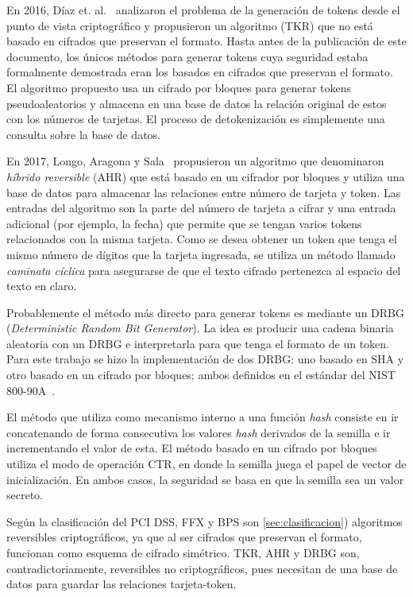 \documentclass[conference]{IEEEtran}
\begin{document}
  En 2016, Díaz et. al.~\cite{doc_sandra} analizaron el problema de la
  generación de tokens desde el punto de vista criptográfico y propusieron un
  algoritmo (TKR) que no está basado en cifrados que preservan el formato. Hasta
  antes de la publicación de este documento, los únicos métodos para generar
  tokens cuya seguridad estaba formalmente demostrada eran los basados en
  cifrados que preservan el formato.  El algoritmo propuesto usa un cifrado por
  bloques para generar tokens pseudoaleatorios y almacena en una base de datos
  la relación original de estos con los números de tarjetas. El proceso de
  detokenización es simplemente una consulta sobre la base de datos.

  En 2017, Longo, Aragona y Sala~\cite{aragona} propusieron un algoritmo que
  denominaron \textit{híbrido reversible} (AHR) que está basado en un cifrador
  por bloques y utiliza una base de datos para almacenar las relaciones entre
  número de tarjeta y token. Las entradas del algoritmo son la parte del número
  de tarjeta a cifrar y una entrada adicional (por ejemplo, la fecha) que
  permite que se tengan varios tokens relacionados con la misma tarjeta. Como se
  desea obtener un token que tenga el mismo número de dígitos que la tarjeta
  ingresada, se utiliza un método llamado \textit{caminata cíclica}
  \cite{blackrog} para asegurarse de que el texto cifrado pertenezca al espacio
  del texto en claro.

  Probablemente el método más directo para generar tokens es mediante un DRBG
  (\textit{Deterministic Random Bit Generator}). La idea es producir una cadena
  binaria aleatoria con un DRBG e interpretarla para que tenga el formato de un
  token. Para este trabajo se hizo la implementación de dos DRBG: uno basado en
  SHA y otro basado en un cifrado por bloques; ambos definidos en el estándar
  del NIST 800-90A~\cite{nist_aleatorios}.

  El método que utiliza como mecanismo interno a una función \textit{hash}
  consiste en ir concatenando de forma consecutiva los valores \textit{hash}
  derivados de la semilla e ir incrementando el valor de esta. El método basado
  en un cifrado por bloques utiliza el modo de operación CTR, en donde la
  semilla juega el papel de vector de inicialización. En ambos casos, la
  seguridad se basa en que la semilla sea un valor secreto.

  Según la clasificación del PCI DSS, FFX y BPS son %
  \ref{sec:clasificacion}) algoritmos reversibles criptográficos, ya que al ser
  cifrados que preservan el formato, funcionan como esquema de cifrado
  simétrico. TKR, AHR y DRBG son, contradictoriamente, reversibles no
  criptográficos, pues necesitan de una base de datos para guardar las
  relaciones tarjeta-token.
\end{document}
